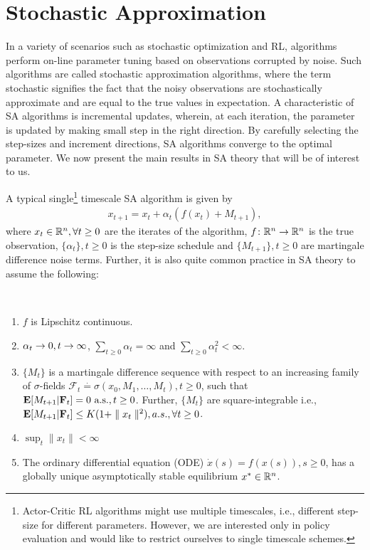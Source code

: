 \section{Stochastic Approximation}
In a variety of scenarios such as stochastic optimization and RL, algorithms perform on-line parameter tuning based on observations corrupted by noise. Such algorithms are called stochastic approximation algorithms, where the term stochastic signifies the fact that the noisy observations are stochastically approximate and are equal to the true values in expectation. A characteristic of SA algorithms is incremental updates, wherein, at each iteration, the parameter is updated by making small step in the right direction. By carefully selecting the step-sizes and increment directions, SA algorithms converge to the optimal parameter. We now present the main results in SA theory that will be of interest to us.\par
A typical single\footnote{Actor-Critic RL algorithms might use multiple timescales, i.e., different step-size for different parameters. However, we are interested only in policy evaluation and would like to restrict ourselves to single timescale schemes.} timescale SA algorithm is given by 
\begin{align}\label{sa}
x_{t+1}=x_t+\alpha_t(f(x_t)+M_{t+1}),
\end{align}
where $x_t\in \mathbb{R}^n, \forall t\geq 0$ are the iterates of the algorithm, $f\colon \mathbb{R}^n \rightarrow \mathbb{R}^n$ is the true observation, $\{\alpha_t\},t\geq 0$ is the step-size schedule and $\{M_{t+1}\}, t\geq 0$ are martingale difference noise terms. Further, it is also quite common practice in SA theory to assume the following:
\begin{assumption}\label{saassump}\hspace{10pt}\\
\vspace{-20pt}
\begin{enumerate}[leftmargin=*]
\item\label{lip} $f$ is Lipschitz continuous.
\item\label{stp} $\alpha_t\rightarrow 0, t\rightarrow\infty$, $\sum_{t\geq 0}\alpha_t =\infty$ and $\sum_{t\geq 0}\alpha^2_t <\infty$.
\item\label{mart} $\{M_t\}$ is a martingale difference sequence with respect to an increasing family of $\sigma$-fields $\mathcal{F}_t\stackrel{\cdot}{=}\sigma(x_0,M_1,\ldots,M_t),t\geq 0$, such that
$
\mathbf{E}[M_{t+1}|\mathbf{F}_t]=0~\text{a.s.}, t\geq 0
$. Further, $\{M_t\}$ are square-integrable i.e., $\mathbf{E}[M_{t+1}|\mathbf{F}_t]\leq K(1+\parallel x_t\parallel^2), a.s., \forall t\geq 0$.
\item\label{bdd} $\sup_t\parallel x_t \parallel<\infty$
\item\label{stab} The ordinary differential equation (ODE) $\dot{x}(s)=f(x(s)), s\geq 0$, has a globally unique asymptotically stable equilibrium $x^*\in \mathbb{R}^n$.
\end{enumerate}\end{assumption}
